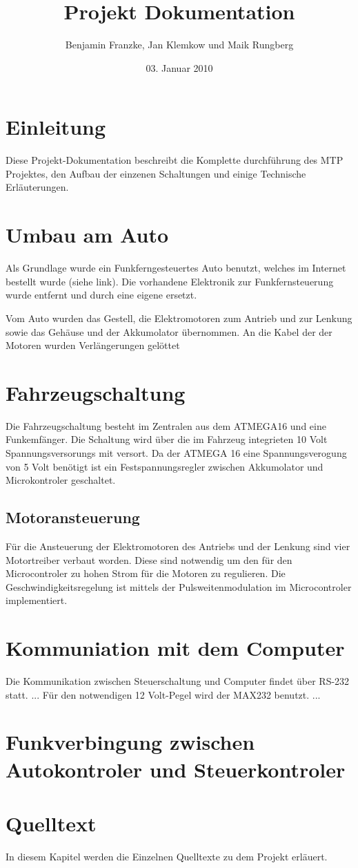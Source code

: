 \documentclass{scrartcl}
\title{Projekt Dokumentation}
\author{Benjamin Franzke, Jan Klemkow und Maik Rungberg}
\date{03. Januar 2010}
\begin{document}
\maketitle
\tableofcontents

\section{Einleitung} %
	Diese Projekt-Dokumentation beschreibt die Komplette durchführung des MTP Projektes, den Aufbau der einzenen Schaltungen und einige Technische Erläuterungen.

\section{Umbau am Auto} %
	Als Grundlage wurde ein Funkferngesteuertes Auto benutzt,
	welches im Internet bestellt wurde (siehe link).
	Die vorhandene Elektronik zur Funkfernsteuerung wurde entfernt und durch eine eigene ersetzt.

	Vom Auto wurden das Gestell, die Elektromotoren zum Antrieb und zur Lenkung sowie das Gehäuse und der Akkumolator übernommen.
	An die Kabel der der Motoren wurden Verlängerungen gelöttet 

\section{Fahrzeugschaltung} %
	Die Fahrzeugschaltung besteht im Zentralen aus dem ATMEGA16 und eine Funkemfänger.
	Die Schaltung wird über die im Fahrzeug integrieten 10 Volt Spannungsversorungs mit versort.
	Da der ATMEGA 16 eine Spannungsverogung von 5 Volt benötigt ist ein Festspannungsregler
	zwischen Akkumolator und Microkontroler geschaltet.

	\subsection{Motoransteuerung}
		Für die Ansteuerung der Elektromotoren des Antriebs und der Lenkung sind vier Motortreiber verbaut worden.
		Diese sind notwendig um den für den Microcontroler zu hohen Strom für die Motoren zu regulieren.
		Die Geschwindigkeitsregelung ist mittels der Pulsweitenmodulation im Microcontroler implementiert.

\section{Kommuniation mit dem Computer} %
	Die Kommunikation zwischen Steuerschaltung und Computer findet über RS-232 statt.
	...
	Für den notwendigen 12 Volt-Pegel wird der MAX232 benutzt.
	...
	

\section{Funkverbingung zwischen Autokontroler und Steuerkontroler} %

\section{Quelltext} %
	In diesem Kapitel werden die Einzelnen Quelltexte zu dem Projekt erläuert.
\end{document}
